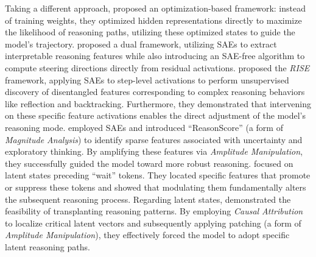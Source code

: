 \documentclass[11pt,letterpaper]{mystyle}
\begin{document}
  Taking a different approach, \citet{wangelicitingcot_aaai2026} proposed an optimization-based framework: instead of training weights, they optimized hidden representations directly to maximize the likelihood of reasoning paths, utilizing these optimized states to guide the model's trajectory.
  \citet{li-etal-2025-feature} proposed a dual framework, utilizing SAEs to extract interpretable reasoning features while also introducing an SAE-free algorithm to compute steering directions directly from residual activations.
  \citet{zhang2025fantastic} proposed the \textit{RISE} framework, applying SAEs to step-level activations to perform unsupervised discovery of disentangled features corresponding to complex reasoning behaviors like reflection and backtracking. Furthermore, they demonstrated that intervening on these specific feature activations enables the direct adjustment of the model's reasoning mode.
  \citet{galichin2025have} employed SAEs and introduced ``ReasonScore'' (a form of \textit{Magnitude Analysis}) to identify sparse features associated with uncertainty and exploratory thinking. By amplifying these features via \textit{Amplitude Manipulation}, they successfully guided the model toward more robust reasoning.
  \citet{troitskii-etal-2025-internal_emnlp2025} focused on latent states preceding ``wait'' tokens. They located specific features that promote or suppress these tokens and showed that modulating them fundamentally alters the subsequent reasoning process.
  Regarding latent states, \citet{cywinski2025interpretlatentreasoning} demonstrated the feasibility of transplanting reasoning patterns. By employing \textit{Causal Attribution} to localize critical latent vectors and subsequently applying patching (a form of \textit{Amplitude Manipulation}), they effectively forced the model to adopt specific latent reasoning paths.
  
\end{document}
